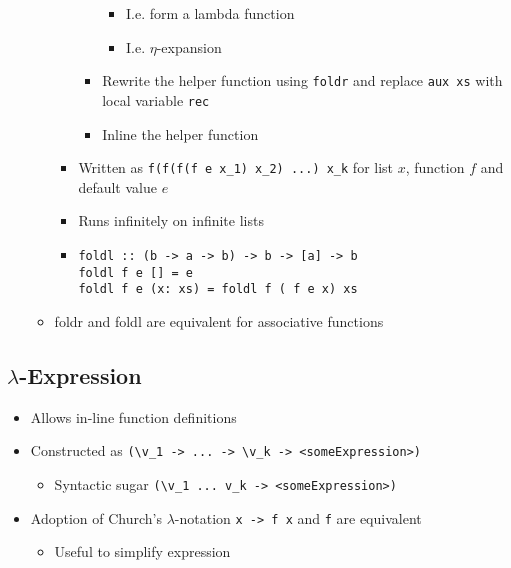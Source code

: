\begin{itemize}
\begin{itemize}
\begin{itemize}
\begin{itemize}
                                \begin{itemize}
                                    \item I.e. form a lambda function
                                    \item I.e. $\eta$-expansion
                                \end{itemize}
                            \item Rewrite the helper function using \verb+foldr+ and replace \verb+aux xs+ with local variable \verb+rec+
                            \item Inline the helper function
                        \end{itemize}
                \end{itemize}
                \begin{itemize}
                    \item Written as \verb+f(f(f(f e x_1) x_2) ...) x_k+ for list $x$, function $f$ and default value $e$
                    \item Runs infinitely on infinite lists
                    \item
\begin{verbatim}
foldl :: (b -> a -> b) -> b -> [a] -> b
foldl f e [] = e
foldl f e (x: xs) = foldl f ( f e x) xs
\end{verbatim}
                \end{itemize}
            \item foldr and foldl are equivalent for associative functions
        \end{itemize}
\end{itemize}

\subsection{$\lambda$-Expression}
\begin{itemize}
    \item Allows in-line function definitions
    \item Constructed as \verb+(\v_1 -> ... -> \v_k -> <someExpression>)+
        \begin{itemize}
            \item Syntactic sugar \verb+(\v_1 ... v_k -> <someExpression>)+
        \end{itemize}
    \item Adoption of Church's $\lambda$-notation
     \verb+x -> f x+ and \verb+f+ are equivalent
        \begin{itemize}
             From left to right
             From Right to left
            \item Useful to simplify expression
        \end{itemize}
\end{itemize}

